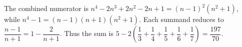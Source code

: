 The combined numerator is $n^4-2n^3+2n^2-2n+1=(n-1)^2(n^2+1)$, while $n^4-1=(n-1)(n+1)(n^2+1)$. Each summand reduces to $\dfrac{n-1}{n+1}=1-\dfrac{2}{n+1}$. Thus the sum is $5-2(\dfrac{1}{3}+\dfrac{1}{4}+\dfrac{1}{5}+\dfrac{1}{6}+\dfrac{1}{7})=\boxed{\dfrac{197}{70}}$.
